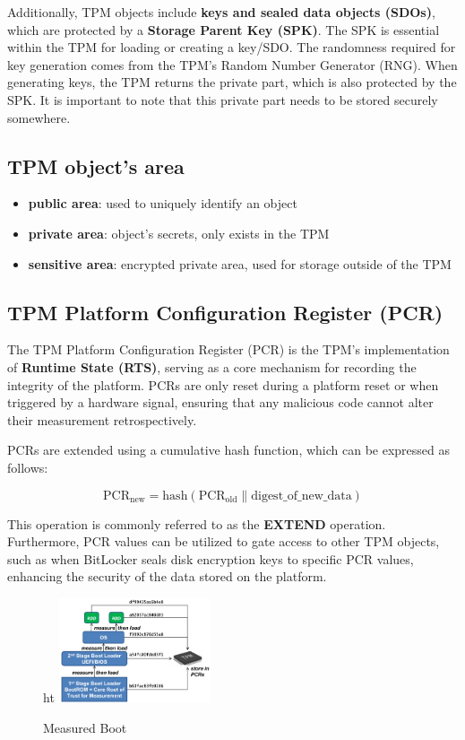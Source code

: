 Additionally, TPM objects include \textbf{keys and sealed data objects (SDOs)}, which are protected by a \textbf{Storage Parent Key (SPK)}. The SPK is essential within the TPM for loading or creating a key/SDO. The randomness required for key generation comes from the TPM's Random Number Generator (RNG). When generating keys, the TPM returns the private part, which is also protected by the SPK. It is important to note that this private part needs to be stored securely somewhere.


\subsection{TPM object's area}
\begin{itemize}
    \item \textbf{public area}: used to uniquely identify an object
    \item \textbf{private area}: object’s secrets, only exists in the TPM
    \item \textbf{sensitive area}:  encrypted private area, used for storage outside of the TPM
\end{itemize}



\subsection{TPM Platform Configuration Register (PCR)}


The TPM Platform Configuration Register (PCR) is the TPM's implementation of \textbf{Runtime State (RTS)}, serving as a core mechanism for recording the integrity of the platform. PCRs are only reset during a platform reset or when triggered by a hardware signal, ensuring that any malicious code cannot alter their measurement retrospectively.

PCRs are extended using a cumulative hash function, which can be expressed as follows:

\[
\text{PCR}_{\text{new}} = \text{hash}(\text{PCR}_{\text{old}} \| \text{digest\_of\_new\_data})
\]

This operation is commonly referred to as the \textbf{EXTEND} operation. Furthermore, PCR values can be utilized to gate access to other TPM objects, such as when BitLocker seals disk encryption keys to specific PCR values, enhancing the security of the data stored on the platform.

\begin{figure}{ht}
    \centering
    \includegraphics[width=0.4\textwidth]{img/measured-boot.png}
    \caption{Measured Boot}
\end{figure}

